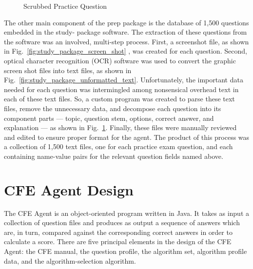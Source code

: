 \begin{figure}
\centering
\vspace{2.0in}
\caption{Scrubbed Practice Question}
\label{fig:study_package_formatted_text}
\end{figure}

The other main component of the prep package is the database of 1,500 questions embedded in the study- package software.  The extraction of these questions from the software was an involved, multi-step process.  First, a screenshot file, as shown in Fig.~\ref{fig:study_package_screen_shot} \cite{acfe_study_package_2011},  was created for each question.  Second, optical character recognition (OCR) software was used to convert the graphic screen shot files into text files, as shown in Fig.~\ref{fig:study_package_unformatted_text}.  Unfortunately, the important data needed for each question was intermingled among nonsensical overhead text in each of these text files.  So, a custom program was created to parse these text files, remove the unnecessary data, and decompose each question into its component parts --- topic, question stem, options, correct answer, and explanation --- as shown in Fig.~\ref{fig:study_package_formatted_text}.  Finally, these files were manually reviewed and edited to ensure proper format for the agent.  The product of this process was a collection of 1,500 text files, one for each practice exam question, and each containing name-value pairs for the relevant question fields named above.




\section{CFE Agent Design}

The CFE Agent is an object-oriented program written in Java.  It takes as input a collection of question files and produces as output a sequence of answers which are, in turn, compared against the corresponding correct answers in order to calculate a score.  There are five principal elements in the design of the CFE Agent: the CFE manual, the question profile, the algorithm set, algorithm profile data, and the algorithm-selection algorithm.

